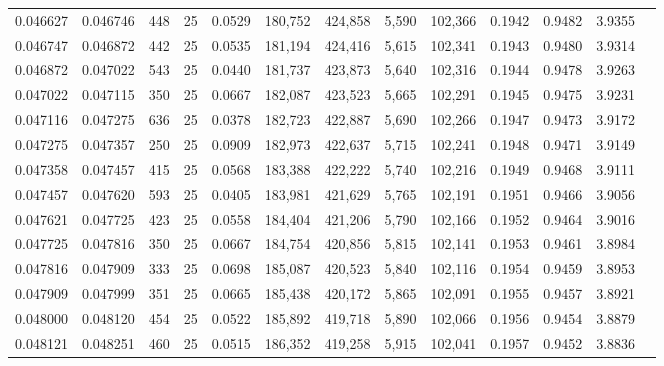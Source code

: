 \begin{tabular}{rrrrrrrrrrrrr}
0.046627 & 0.046746 &   448 &  25 &                                     0.0529 & 180,752 & 424,858 &   5,590 & 102,366 & 0.1942 & 0.9482 & 3.9355 \\
0.046747 & 0.046872 &   442 &  25 &                                     0.0535 & 181,194 & 424,416 &   5,615 & 102,341 & 0.1943 & 0.9480 & 3.9314 \\
0.046872 & 0.047022 &   543 &  25 &                                     0.0440 & 181,737 & 423,873 &   5,640 & 102,316 & 0.1944 & 0.9478 & 3.9263 \\
0.047022 & 0.047115 &   350 &  25 &                                     0.0667 & 182,087 & 423,523 &   5,665 & 102,291 & 0.1945 & 0.9475 & 3.9231 \\
0.047116 & 0.047275 &   636 &  25 &                                     0.0378 & 182,723 & 422,887 &   5,690 & 102,266 & 0.1947 & 0.9473 & 3.9172 \\
0.047275 & 0.047357 &   250 &  25 &                                     0.0909 & 182,973 & 422,637 &   5,715 & 102,241 & 0.1948 & 0.9471 & 3.9149 \\
0.047358 & 0.047457 &   415 &  25 &                                     0.0568 & 183,388 & 422,222 &   5,740 & 102,216 & 0.1949 & 0.9468 & 3.9111 \\
0.047457 & 0.047620 &   593 &  25 &                                     0.0405 & 183,981 & 421,629 &   5,765 & 102,191 & 0.1951 & 0.9466 & 3.9056 \\
0.047621 & 0.047725 &   423 &  25 &                                     0.0558 & 184,404 & 421,206 &   5,790 & 102,166 & 0.1952 & 0.9464 & 3.9016 \\
0.047725 & 0.047816 &   350 &  25 &                                     0.0667 & 184,754 & 420,856 &   5,815 & 102,141 & 0.1953 & 0.9461 & 3.8984 \\
0.047816 & 0.047909 &   333 &  25 &                                     0.0698 & 185,087 & 420,523 &   5,840 & 102,116 & 0.1954 & 0.9459 & 3.8953 \\
0.047909 & 0.047999 &   351 &  25 &                                     0.0665 & 185,438 & 420,172 &   5,865 & 102,091 & 0.1955 & 0.9457 & 3.8921 \\
0.048000 & 0.048120 &   454 &  25 &                                     0.0522 & 185,892 & 419,718 &   5,890 & 102,066 & 0.1956 & 0.9454 & 3.8879 \\
0.048121 & 0.048251 &   460 &  25 &                                     0.0515 & 186,352 & 419,258 &   5,915 & 102,041 & 0.1957 & 0.9452 & 3.8836 \\

\end{tabular}
